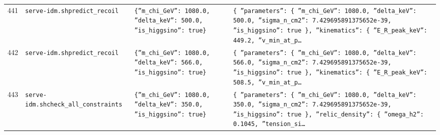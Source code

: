 \documentclass[11pt,a4paper]{article}
\begin{document}
\begin{longtable}{@{}p{}p{}p{}p{}@{}}
441 & \texttt{serve-idm.sh}\newline\texttt{predict\_\allowbreak{}recoil} & \texttt{\{''m\_\allowbreak{}chi\_\allowbreak{}GeV'':\allowbreak{} 1080.0,\allowbreak{} ''delta\_\allowbreak{}keV'':\allowbreak{} 500.0,\allowbreak{} ''is\_\allowbreak{}higgsino'':\allowbreak{} true\}\allowbreak{}} & \texttt{\{   ''parameters'':\allowbreak{} \{     ''m\_\allowbreak{}chi\_\allowbreak{}GeV'':\allowbreak{} 1080.0,\allowbreak{}     ''delta\_\allowbreak{}keV'':\allowbreak{} 500.0,\allowbreak{}     ''sigma\_\allowbreak{}n\_\allowbreak{}cm2'':\allowbreak{} 7.429695891375652e-39,\allowbreak{}     ''is\_\allowbreak{}higgsino'':\allowbreak{} true   \}\allowbreak{},\allowbreak{}   ''kinematics'':\allowbreak{} \{     ''E\_\allowbreak{}R\_\allowbreak{}peak\_\allowbreak{}keV'':\allowbreak{} 449.2,\allowbreak{}     ''v\_\allowbreak{}min\_\allowbreak{}at\_\allowbreak{}p\ldots{}\allowbreak{}} \\
442 & \texttt{serve-idm.sh}\newline\texttt{predict\_\allowbreak{}recoil} & \texttt{\{''m\_\allowbreak{}chi\_\allowbreak{}GeV'':\allowbreak{} 1080.0,\allowbreak{} ''delta\_\allowbreak{}keV'':\allowbreak{} 566.0,\allowbreak{} ''is\_\allowbreak{}higgsino'':\allowbreak{} true\}\allowbreak{}} & \texttt{\{   ''parameters'':\allowbreak{} \{     ''m\_\allowbreak{}chi\_\allowbreak{}GeV'':\allowbreak{} 1080.0,\allowbreak{}     ''delta\_\allowbreak{}keV'':\allowbreak{} 566.0,\allowbreak{}     ''sigma\_\allowbreak{}n\_\allowbreak{}cm2'':\allowbreak{} 7.429695891375652e-39,\allowbreak{}     ''is\_\allowbreak{}higgsino'':\allowbreak{} true   \}\allowbreak{},\allowbreak{}   ''kinematics'':\allowbreak{} \{     ''E\_\allowbreak{}R\_\allowbreak{}peak\_\allowbreak{}keV'':\allowbreak{} 508.5,\allowbreak{}     ''v\_\allowbreak{}min\_\allowbreak{}at\_\allowbreak{}p\ldots{}\allowbreak{}} \\
443 & \texttt{serve-idm.sh}\newline\texttt{check\_\allowbreak{}all\_\allowbreak{}constraints} & \texttt{\{''m\_\allowbreak{}chi\_\allowbreak{}GeV'':\allowbreak{} 1080.0,\allowbreak{} ''delta\_\allowbreak{}keV'':\allowbreak{} 350.0,\allowbreak{} ''is\_\allowbreak{}higgsino'':\allowbreak{} true\}\allowbreak{}} & \texttt{\{   ''parameters'':\allowbreak{} \{     ''m\_\allowbreak{}chi\_\allowbreak{}GeV'':\allowbreak{} 1080.0,\allowbreak{}     ''delta\_\allowbreak{}keV'':\allowbreak{} 350.0,\allowbreak{}     ''sigma\_\allowbreak{}n\_\allowbreak{}cm2'':\allowbreak{} 7.429695891375652e-39,\allowbreak{}     ''is\_\allowbreak{}higgsino'':\allowbreak{} true   \}\allowbreak{},\allowbreak{}   ''relic\_\allowbreak{}density'':\allowbreak{} \{     ''omega\_\allowbreak{}h2'':\allowbreak{} 0.1045,\allowbreak{}     ''tension\_\allowbreak{}si\ldots{}\allowbreak{}} \\

\end{longtable}
\end{document}

